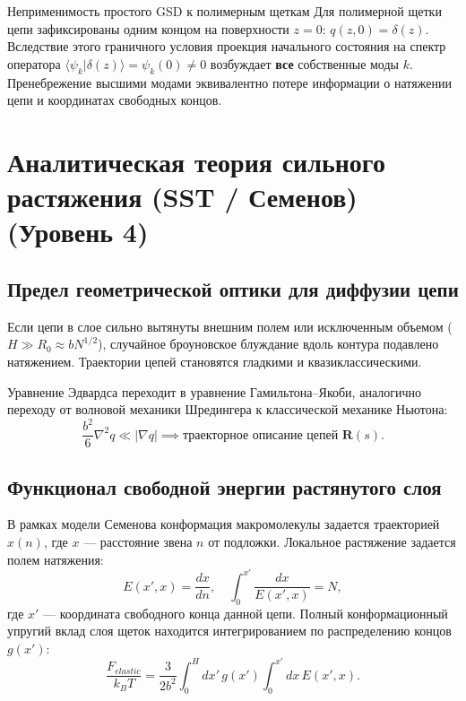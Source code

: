 \documentclass[12pt,a4paper]{article}
\begin{document}
\begin{warningbox}{Неприменимость простого GSD к полимерным щеткам}
Для полимерной щетки цепи зафиксированы одним концом на поверхности $z=0$: $q(z, 0) = \delta(z)$. Вследствие этого граничного условия проекция начального состояния на спектр оператора $\langle \psi_k | \delta(z) \rangle = \psi_k(0) \neq 0$ возбуждает \textbf{все} собственные моды $k$. Пренебрежение высшими модами эквивалентно потере информации о натяжении цепи и координатах свободных концов.
\end{warningbox}

\section{Аналитическая теория сильного растяжения (SST / Семенов) (Уровень 4)}

\subsection{Предел геометрической оптики для диффузии цепи}
Если цепи в слое сильно вытянуты внешним полем или исключенным объемом ($H \gg R_0 \approx b N^{1/2}$), случайное броуновское блуждание вдоль контура подавлено натяжением. Траектории цепей становятся гладкими и квазиклассическими. 

Уравнение Эдвардса переходит в уравнение Гамильтона--Якоби, аналогично переходу от волновой механики Шредингера к классической механике Ньютона:
\begin{equation}
\frac{b^2}{6}\nabla^2 q \ll \left| \nabla q \right| \implies \text{траекторное описание цепей } \mathbf{R}(s).
\end{equation}

\subsection{Функционал свободной энергии растянутого слоя}
В рамках модели Семенова конформация макромолекулы задается траекторией $x(n)$, где $x$ --- расстояние звена $n$ от подложки. Локальное растяжение задается полем натяжения:
\begin{equation}
E(x', x) = \frac{dx}{dn}, \quad \int_0^{x'} \frac{dx}{E(x', x)} = N,
\end{equation}
где $x'$ --- координата свободного конца данной цепи.
Полный конформационный упругий вклад слоя щеток находится интегрированием по распределению концов $g(x')$:
\begin{equation}
\frac{F_{elastic}}{k_B T} = \frac{3}{2b^2} \int_0^H dx' \, g(x') \int_0^{x'} dx \, E(x', x).
\end{equation}
\end{document}
